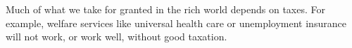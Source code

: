 Much of what we take for granted in the rich world depends on taxes.
For example, welfare services like universal health care or unemployment insurance will not work, or work well, without good taxation.